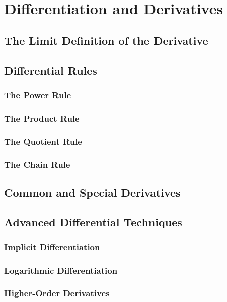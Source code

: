 \chapter{Differentiation and Derivatives}

\section{The Limit Definition of the Derivative}

\section{Differential Rules}
\subsection{The Power Rule}
\subsection{The Product Rule}
\subsection{The Quotient Rule}
\subsection{The Chain Rule}

\section{Common and Special Derivatives}

\section{Advanced Differential Techniques}
\subsection{Implicit Differentiation}
\subsection{Logarithmic Differentiation}
\subsection{Higher-Order Derivatives}